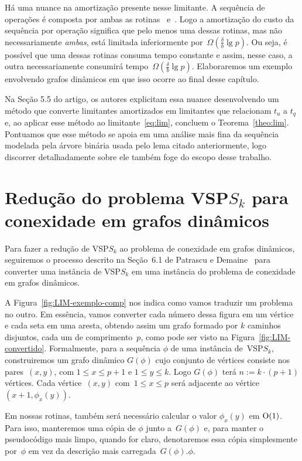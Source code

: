 Há uma nuance na amortização presente nesse limitante. A sequência de operações é composta por ambas as rotinas~\VPSPupdate{} e~\VPSPverify.
Logo a amortização do custo da sequência por operação significa que pelo menos uma dessas rotinas, mas não necessariamente \textit{ambas}, está limitada inferiormente por~$\Omega(\frac{\delta}{b}\lg p)$. Ou seja, é possível que uma dessas rotinas consuma tempo constante e assim, nesse caso, a outra necessariamente consumirá tempo~$\Omega(\frac{\delta}{b}\lg p)$. Elaboraremos um exemplo envolvendo grafos dinâmicos em que isso ocorre ao final desse capítulo. 


Na Seção 5.5 do artigo, os autores explicitam essa nuance desenvolvendo um método que converte limitantes amortizados em limitantes que relacionam $t_u$ a $t_q$ e, ao aplicar esse método ao limitante~\eqref{eq:lim}, concluem o Teorema~\ref{theo:lim}. Pontuamos que esse método se apoia em uma análise mais fina da sequência modelada pela árvore binária usada pelo lema citado anteriormente, logo discorrer detalhadamente sobre ele também foge do escopo desse trabalho.


\section[Redução do VSP$S_k$ para conexidade em grafos dinâmicos]{Redução do problema VSP$S_k$ para conexidade em grafos dinâmicos}

Para fazer a redução de VSP$S_k$ ao problema de conexidade em grafos dinâmicos, seguiremos o processo descrito na Seção~6.1 de Patrascu e Demaine~\cite{lowerBoundPatrascu} para  converter uma instância de VSP$S_k$ em uma instância do problema de conexidade em grafos dinâmicos. 

A Figura~\ref{fig:LIM-exemplo-comp} nos indica como vamos traduzir um problema no outro. Em essência, vamos converter cada número dessa figura em um vértice e cada seta em uma aresta, obtendo assim um grafo formado por $k$ caminhos disjuntos, cada um de comprimento~$p$, como pode ser visto na Figura~\ref{fig:LIM-convertido}. Formalmente, para a sequência $\phi$ de uma instância de~VSP$S_k$, construiremos um grafo dinâmico $G(\phi)$ cujo conjunto de vértices consiste nos pares~$(x,y)$, com $1\leqslant x \leqslant p+1$ e $1\leqslant y \leqslant k$. Logo $G(\phi)$ terá $n:=k\cdot (p+1)$ vértices. Cada vértice~$(x,y)$ com~$1\leqslant x \leqslant p$ será adjacente ao vértice~$(x+1,\phi_x(y))$. 

Em nossas rotinas, também será necessário calcular o valor $\phi_x(y)$ em $\mathrm{O}(1)$. Para isso, manteremos uma cópia de $\phi$ junto a~$G(\phi)$ e, para manter o pseudocódigo mais limpo, quando for claro, denotaremos essa cópia simplesmente por~$\phi$ em vez da descrição mais carregada~$G(\phi).\phi$.



